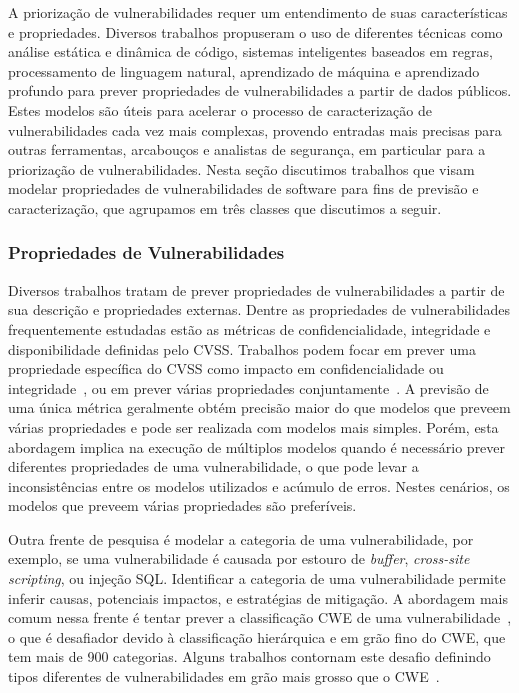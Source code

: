 A priorização de vulnerabilidades requer um entendimento de suas características e propriedades. Diversos trabalhos propuseram o uso de diferentes técnicas como análise estática e dinâmica de código, sistemas inteligentes baseados em regras, processamento de linguagem natural, aprendizado de máquina e aprendizado profundo para prever propriedades de vulnerabilidades a partir de dados públicos. Estes modelos são úteis para acelerar o processo de caracterização de vulnerabilidades cada vez mais complexas, provendo entradas mais precisas para outras ferramentas, arcabouços e analistas de segurança, em particular para a priorização de vulnerabilidades.
Nesta seção discutimos trabalhos que visam modelar propriedades de vulnerabilidades de software para fins de previsão e caracterização, que agrupamos em três classes que discutimos a seguir.

\subsubsection{Propriedades de Vulnerabilidades}

Diversos trabalhos tratam de prever propriedades de vulnerabilidades a partir de sua descrição e propriedades externas. Dentre as propriedades de vulnerabilidades frequentemente estudadas estão as métricas de confidencialidade, integridade e disponibilidade definidas pelo CVSS\@. Trabalhos podem focar em prever uma propriedade específica do CVSS como impacto em confidencialidade ou integridade~\cite{chen2019vest,elbaz2020fighting,jiang2020approach, le2019automated, wen2015novel, yamamoto2015text, toloudis2016associating}, ou em prever várias propriedades conjuntamente~\cite{gawron2018automatic, gong2019joint, spanos2018multi}. A previsão de uma única métrica geralmente obtém precisão maior do que modelos que preveem várias propriedades e pode ser realizada com modelos mais simples. Porém, esta abordagem implica na execução de múltiplos modelos quando é necessário prever diferentes propriedades de uma vulnerabilidade, o que pode levar a inconsistências entre os modelos utilizados e acúmulo de erros. Nestes cenários, os modelos que preveem várias propriedades são preferíveis.

Outra frente de pesquisa é modelar a categoria de uma vulnerabilidade, por exemplo, se uma vulnerabilidade é causada por estouro de \emph{buffer}, \emph{cross-site scripting}, ou injeção SQL\@. Identificar a categoria de uma vulnerabilidade permite inferir causas, potenciais impactos, e estratégias de mitigação. A abordagem mais comum nessa frente é tentar prever a classificação CWE de uma vulnerabilidade~\cite{das2021v2w, zou2019mu, ruohonen2018toward}, o que é desafiador devido à classificação hierárquica e em grão fino do CWE, que tem mais de 900 categorias. Alguns trabalhos contornam este desafio definindo tipos diferentes de vulnerabilidades em grão mais grosso que o CWE~\cite{naim2017scalable, russo2019summarizing}.


